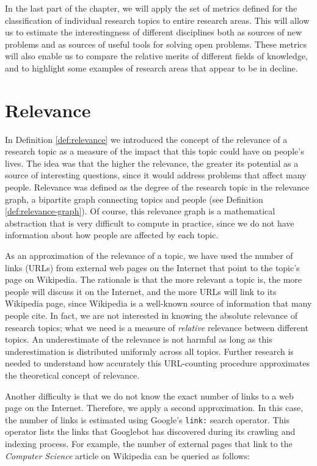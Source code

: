 In the last part of the chapter, we will apply the set of metrics defined for the classification of individual research topics to entire research areas. This will allow us to estimate the interestingness of different disciplines both as sources of new problems and as sources of useful tools for solving open problems. These metrics will also enable us to compare the relative merits of different fields of knowledge, and to highlight some examples of research areas that appear to be in decline.

%
%
\section{Relevance}
\label{sec:relevance_in_practice}

In Definition \ref{def:relevance} we introduced the concept of the relevance of a research topic as a measure of the impact that this topic could have on people's lives. The idea was that the higher the relevance, the greater its potential as a source of interesting questions, since it would address problems that affect many people. Relevance was defined as the degree of the research topic in the relevance graph, a bipartite graph connecting topics and people (see Definition \ref{def:relevance-graph}). Of course, this relevance graph is a mathematical abstraction that is very difficult to compute in practice, since we do not have information about how people are affected by each topic.

As an approximation of the relevance of a topic, we have used the number of links (URLs) from external web pages on the Internet that point to the topic's page on Wikipedia. The rationale is that the more relevant a topic is, the more people will discuss it on the Internet, and the more URLs will link to its Wikipedia page, since Wikipedia is a well-known source of information that many people cite. In fact, we are not interested in knowing the absolute relevance of research topics; what we need is a measure of \emph{relative} relevance between different topics. An underestimate of the relevance is not harmful as long as this underestimation is distributed uniformly across all topics. Further research is needed to understand how accurately this URL-counting procedure approximates the theoretical concept of relevance. 

Another difficulty is that we do not know the exact number of links to a web page on the Internet. Therefore, we apply a second approximation. In this case, the number of links is estimated using Google's \texttt{link:} search operator. This operator lists the links that Googlebot has discovered during its crawling and indexing process. For example, the number of external pages that link to the \emph{Computer Science} article on Wikipedia can be queried as follows:

